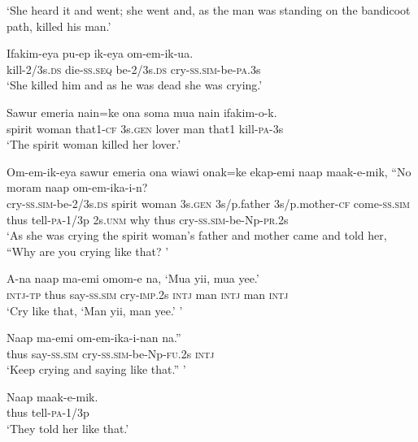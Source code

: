 \glt ‘She heard it and went; she went and, as the man was standing on the bandicoot path, killed his man.’ \\
\z


\ea\label{ex:a:x6}
\gll  Ifakim-eya  pu-ep  ik-eya  om-em-ik-ua. \\
kill-2/3s.\textsc{ds}  die-\textsc{ss.seq}  be-2/3s.\textsc{ds}  cry-\textsc{ss}.\textsc{sim}-be-\textsc{pa}.3s \\
\glt ‘She killed him and as he was dead she was crying.’ \\
\z


\ea\label{ex:a:x7}
\gll  Sawur  emeria  nain=ke  ona  soma  mua  nain  ifakim-o-k. \\
spirit  woman  that1-\textsc{cf}  3s.\textsc{gen}  lover  man  that1  kill-\textsc{pa}-3s \\
\glt ‘The spirit woman killed her lover.’ \\
\z


\ea\label{ex:a:x8}
\gll  Om-em-ik-eya  sawur  emeria  ona  wiawi  onak=ke                     ekap-emi  naap  maak-e-mik,  “No  moram  naap  om-em-ika-i-n? \\
cry-\textsc{ss}.\textsc{sim}-be-2/3s.\textsc{ds}  spirit  woman  3s.\textsc{gen}  3s/p.father  3s/p.mother-\textsc{cf}  come-\textsc{ss}.\textsc{sim}  thus  tell-\textsc{pa}-1/3p  2s.\textsc{unm}  why  thus  cry-\textsc{ss}.\textsc{sim}-be-Np-\textsc{pr}.2s \\


\glt ‘As she was crying the spirit woman’s father and mother came and told her, “Why are you crying like that? ’ \\
\z


\ea\label{ex:a:x9}
\gll  A-na  naap  ma-emi  omom-e  na,  ‘Mua  yii,  mua  yee.’ \\
\textsc{intj}-\textsc{tp}  thus  say-\textsc{ss}.\textsc{sim}  cry-\textsc{imp}.2s  \textsc{intj}  man  \textsc{intj}  man  \textsc{intj} \\
\glt ‘Cry like that, ‘Man yii, man yee.’ ’ \\
\z


\ea\label{ex:a:x10}
\gll  Naap  ma-emi  om-em-ika-i-nan  na.” \\
thus  say-\textsc{ss}.\textsc{sim}  cry-\textsc{ss}.\textsc{sim}-be-Np-\textsc{fu}.2s  \textsc{intj} \\
\glt ‘Keep crying and saying like that.” ’ \\
\z


\ea\label{ex:a:x11}
\gll  Naap  maak-e-mik. \\
thus  tell-\textsc{pa}-1/3p \\
\glt ‘They told her like that.’ \\
\z


